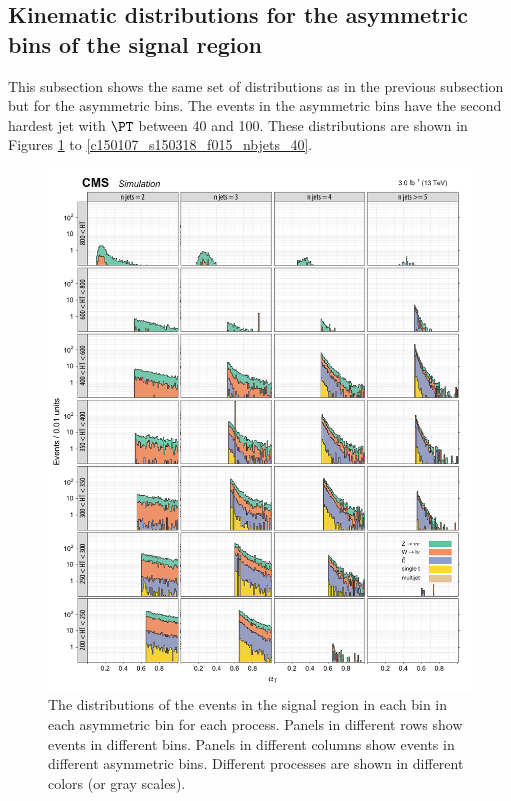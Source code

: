 \subsection{Kinematic distributions for the asymmetric \njet bins of the signal region}

This subsection shows the same set of distributions as in the previous
subsection but for the asymmetric \njet bins. The events in the
asymmetric \njet bins have the second hardest jet with $\PT$ between 40
and 100\gev. These distributions are shown in Figures
\ref{c150107_s150318_f015_alphaT_40} to
\ref{c150107_s150318_f015_nbjets_40}.

\begin{figure}[!h]
\centering
\includegraphics[scale=0.95]{figures/kiplots/c150107_s150318_f015_alphaT_40}
\caption{The \alphat distributions of the events in the signal region
in each \scalht bin in each asymmetric \njet bin for each process.
Panels in different rows show events in different \scalht bins. Panels
in different columns show events in different asymmetric \njet bins.
Different processes are shown in different colors (or gray scales).}
\label{c150107_s150318_f015_alphaT_40}
\end{figure}

